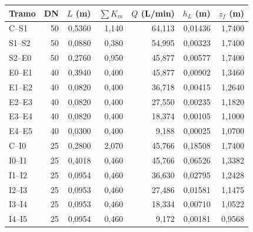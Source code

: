 \begin{tabular}{@{}lrrrrrr@{}}
\toprule
Tramo & DN & $L$ (m) & $\sum K_m$ & $Q$ (L/min) & $h_L$ (m) & $z_f$ (m)\\\midrule
C--S1 & 50 & 0{,}5360 & 1{,}140 & 64{,}113 & 0{,}01436 & 1{,}7400\\
S1--S2 & 50 & 0{,}0880 & 0{,}380 & 54{,}995 & 0{,}00323 & 1{,}7400\\
S2--E0 & 50 & 0{,}2760 & 0{,}950 & 45{,}877 & 0{,}00577 & 1{,}7400\\
E0--E1 & 40 & 0{,}3940 & 0{,}400 & 45{,}877 & 0{,}00902 & 1{,}3460\\
E1--E2 & 40 & 0{,}0820 & 0{,}400 & 36{,}718 & 0{,}00415 & 1{,}2640\\
E2--E3 & 40 & 0{,}0820 & 0{,}400 & 27{,}550 & 0{,}00235 & 1{,}1820\\
E3--E4 & 40 & 0{,}0820 & 0{,}400 & 18{,}374 & 0{,}00105 & 1{,}1000\\
E4--E5 & 40 & 0{,}0300 & 0{,}400 & 9{,}188 & 0{,}00025 & 1{,}0700\\
C--I0 & 25 & 0{,}2800 & 2{,}070 & 45{,}766 & 0{,}18508 & 1{,}7400\\
I0--I1 & 25 & 0{,}4018 & 0{,}460 & 45{,}766 & 0{,}06526 & 1{,}3382\\
I1--I2 & 25 & 0{,}0954 & 0{,}460 & 36{,}630 & 0{,}02795 & 1{,}2428\\
I2--I3 & 25 & 0{,}0953 & 0{,}460 & 27{,}486 & 0{,}01581 & 1{,}1475\\
I3--I4 & 25 & 0{,}0953 & 0{,}460 & 18{,}334 & 0{,}00710 & 1{,}0522\\
I4--I5 & 25 & 0{,}0954 & 0{,}460 & 9{,}172 & 0{,}00181 & 0{,}9568\\
\bottomrule
\end{tabular}